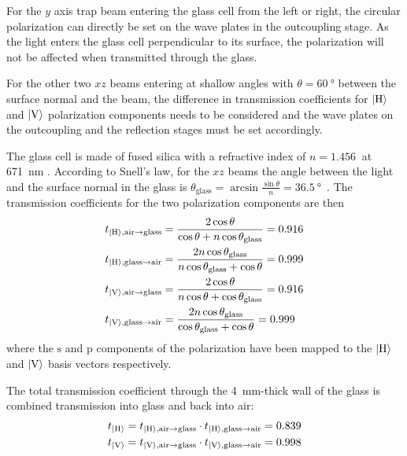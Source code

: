 For the $y$ axis trap beam entering the glass cell from the left or right, the circular polarization can directly be set on the wave plates in the outcoupling stage. As the light enters the glass cell perpendicular to its surface, the polarization will not be affected when transmitted through the glass.

For the other two $xz$ beams entering at shallow angles with $\theta = \SI{60}{\degree}$ between the surface normal and the beam, the difference in transmission coefficients for $\Ket{\text{H}}$ and $\Ket{\text{V}}$ polarization components needs to be considered and the wave plates on the outcoupling and the reflection stages must be set accordingly.

The glass cell is made of fused silica with a refractive index of $n = \SI{1.456}{}$ at \SI{671}{\nano\meter} \cite{malitson_interspecimen_1965}. According to Snell's law, for the $xz$ beams the angle between the light and the surface normal in the glass is $\theta_\text{glass} = \arcsin \frac{\sin \theta}{n} = \SI{36.5}{\degree}$~\cite{demtroder_elektromagnetische_2013}. The transmission coefficients for the two polarization components are then~\cite{demtroder_elektromagnetische_2013}
\begin{align}\label{eq:fresnel}
    \begin{split}
        t_{\Ket{\text{H}}, \text{air} \rightarrow \text{glass}} &= \frac{2 \cos \theta}{\cos \theta + n \cos \theta_\text{glass}} =  \SI{0.916}{}\\
        t_{\Ket{\text{H}}, \text{glass} \rightarrow \text{air}} &= \frac{2n \cos \theta_\text{glass}}{n \cos \theta_\text{glass} + \cos \theta} = \SI{0.999}{} \\
        t_{\Ket{\text{V}}, \text{air} \rightarrow \text{glass}} &= \frac{2 \cos \theta}{n \cos \theta + \cos \theta_\text{glass}} = \SI{0.916}{}\\ 
        t_{\Ket{\text{V}}, \text{glass} \rightarrow \text{air}} &= \frac{2 n \cos \theta_\text{glass}}{\cos \theta_\text{glass} + \cos \theta} = \SI{0.999}{}\\ 
    \end{split}
\end{align}
where the $\text{s}$ and $\text{p}$ components of the polarization have been mapped to the $\Ket{\text{H}}$ and $\Ket{\text{V}}$ basis vectors respectively.

The total transmission coefficient through the \SI{4}{\milli\meter}-thick wall of the glass is combined transmission into glass and back into air:
\begin{align}
    \begin{split}
        t_{\Ket{\text{H}}} &= t_{\Ket{\text{H}}, \text{air} \rightarrow \text{glass}}  \cdot t_{\Ket{\text{H}}, \text{glass} \rightarrow \text{air}} = \SI{0.839}{} \\
        t_{\Ket{\text{V}}} &= t_{\Ket{\text{V}}, \text{air} \rightarrow \text{glass}}  \cdot t_{\Ket{\text{V}}, \text{glass} \rightarrow \text{air}} = \SI{0.998}{}
    \end{split}
\end{align}

